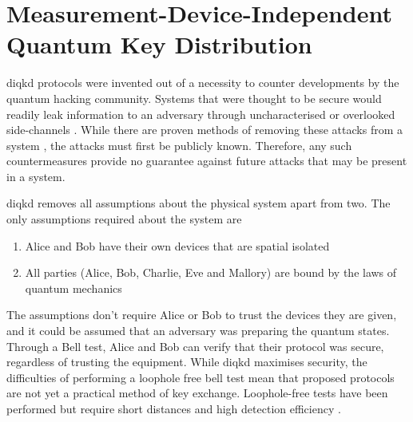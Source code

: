 
\section{Measurement-Device-Independent Quantum Key Distribution}
\label{sec:mdi-qkd}

\Ac{diqkd} protocols were invented out of a necessity to counter developments by the quantum hacking community. Systems that were thought to be secure would readily leak information to an adversary through uncharacterised or overlooked side-channels \cite{}. While there are proven methods of removing these attacks from a system \cite{}, the attacks must first be publicly known. Therefore, any such countermeasures provide no guarantee against future attacks that may be present in a system. 

\Ac{diqkd} removes all assumptions about the physical system apart from two. The only assumptions required about the system are

\begin{enumerate}
	\item Alice and Bob have their own devices that are spatial isolated
	\item All parties (Alice, Bob, Charlie, Eve and Mallory) are bound by the laws of quantum mechanics
\end{enumerate}

The assumptions don't require Alice or Bob to trust the devices they are given, and it could be assumed that an adversary was preparing the quantum states. Through a Bell test, Alice and Bob can verify that their protocol was secure, regardless of trusting the equipment. While \ac{diqkd} maximises security, the difficulties of performing a loophole free bell test mean that proposed protocols are not yet a practical method of key exchange. Loophole-free tests have been performed but require short distances and high detection efficiency \cite{hensen2015, shalm2015, Giustina2015}. 

